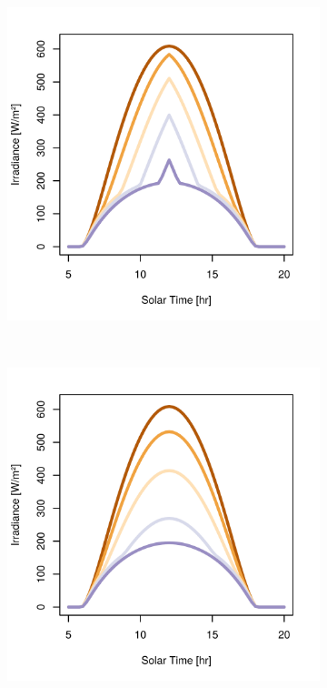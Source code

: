 \begin{figure}[h]
\begin{subfigure}[t]{\subfigureWidth}
  		\includegraphics[height=\graphicsHeight]{sections/mars-solar-energy/solar-radiation/plots/gi-variationfor-ls-248-phi-2-tau-05-gammac-east-and-albedo-027.png}
  		\label{fig:sub:irradiance-inclined-gamma-c-m90}
  	\end{subfigure}\\[0.8ex]
    \begin{subfigure}[t]{\subfigureWidth}
      \centering
  		\includegraphics[height=\graphicsHeight]{sections/mars-solar-energy/solar-radiation/plots/gi-variationfor-ls-248-phi-2-tau-05-gammac-south-and-albedo-027.png}

\end{subfigure}
\end{figure}
